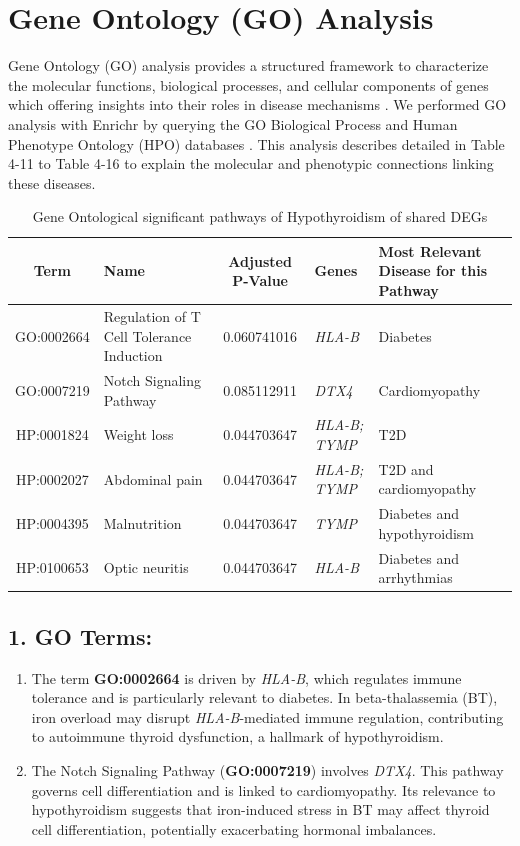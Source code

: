 \section{Gene Ontology (GO) Analysis}
\label{sec:sec4_5}
Gene Ontology (GO) analysis provides a structured framework to characterize the molecular functions, biological processes, and cellular components of genes which offering insights into their roles in disease mechanisms \cite{b5}. We performed GO analysis with Enrichr by querying the GO Biological Process and Human Phenotype Ontology (HPO) databases \cite{b6}. This analysis describes detailed in Table 4-11 to Table 4-16 to explain the molecular and phenotypic connections linking these diseases.

\begin{table}[H]
\centering
\caption{Gene Ontological significant pathways of Hypothyroidism of shared DEGs}
\label{tab:Hypothyroidism_GO}
\renewcommand{\arraystretch}{1.2} %
\small
\begin{tabularx}{\textwidth}{|c|X|c|X|X|}
\hline
\textbf{Term} & \textbf{Name} & \textbf{Adjusted P-Value} & \textbf{Genes} & \textbf{Most Relevant Disease for this Pathway} \\
\hline
GO:0002664 & Regulation of T Cell Tolerance Induction & 0.060741016 & \textit{HLA-B} & Diabetes \\
\hline
GO:0007219 & Notch Signaling Pathway & 0.085112911 & \textit{DTX4} & Cardiomyopathy \\
\hline
HP:0001824 & Weight loss & 0.044703647 & \textit{HLA-B; TYMP} & T2D \\
\hline
HP:0002027 & Abdominal pain & 0.044703647 & \textit{HLA-B; TYMP} & T2D and cardiomyopathy \\
\hline
HP:0004395 & Malnutrition & 0.044703647 & \textit{TYMP} & Diabetes and hypothyroidism \\
\hline
HP:0100653 & Optic neuritis & 0.044703647 & \textit{HLA-B} & Diabetes and arrhythmias \\
\hline
\end{tabularx}
\end{table}

\subsection*{1. GO Terms: }
\begin{enumerate}
    \item The term \textbf{GO:0002664} is driven by \textit{HLA-B}, which regulates immune tolerance and is particularly relevant to diabetes. In beta-thalassemia (BT), iron overload may disrupt \textit{HLA-B}-mediated immune regulation, contributing to autoimmune thyroid dysfunction, a hallmark of hypothyroidism.
    
    \item The Notch Signaling Pathway (\textbf{GO:0007219}) involves \textit{DTX4}. This pathway governs cell differentiation and is linked to cardiomyopathy. Its relevance to hypothyroidism suggests that iron-induced stress in BT may affect thyroid cell differentiation, potentially exacerbating hormonal imbalances.
\end{enumerate}


